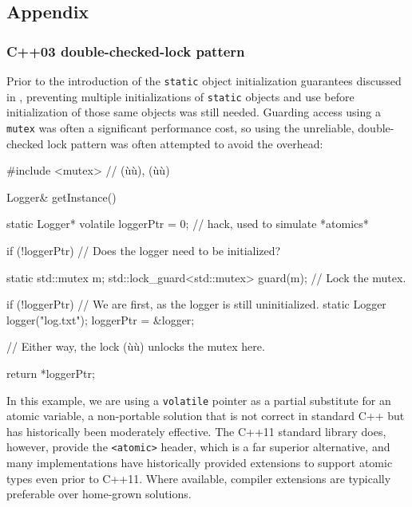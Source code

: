 \subsection[Appendix]{Appendix}\label{appendix-functionstatic}

\subsubsection[C++03 double-checked-lock pattern]{C++03 double-checked-lock pattern}\label{appendix:-c++03-double-checked-lock-pattern}

Prior to the introduction of the  \lstinline!static!
object initialization guarantees discussed in , preventing multiple initializations of \lstinline!static! objects
and use before initialization of those same objects was still needed.
Guarding access using a \lstinline!mutex! was often a significant performance cost, so
using the unreliable, double-checked lock pattern was often attempted to
avoid the overhead:

\enlargethispage*{2ex}
\begin{emcppshiddenlisting}[emcppsbatch=e16]
#include <mutex>  // (ù{}ù), (ù{}ù)
\end{emcppshiddenlisting}
\begin{emcppslisting}[emcppsbatch=e16]
Logger& getInstance()
{
    static Logger* volatile loggerPtr = 0;  // hack, used to simulate *atomics*

    if (!loggerPtr)  // Does the logger need to be initialized?
    {
        static std::mutex m;
        std::lock_guard<std::mutex> guard(m);  // Lock the mutex.

        if (!loggerPtr)  // We are first, as the logger is still uninitialized.
        {
            static Logger logger("log.txt");
            loggerPtr = &logger;
        }
    }                    // Either way, the lock (ù{}ù) unlocks the mutex here.

    return *loggerPtr;
}
\end{emcppslisting}

\noindent In this example, we are using a \lstinline!volatile! pointer
as a partial
substitute for an atomic variable, a non-portable solution that is not correct
in standard C++ but has historically been moderately effective.  The C++11 standard
library does, however, provide the \lstinline!<atomic>! header, which is a far superior alternative,
and many implementations have historically
provided extensions to support atomic types even prior to C++11.  Where available, compiler extensions are typically preferable over home-grown solutions.

